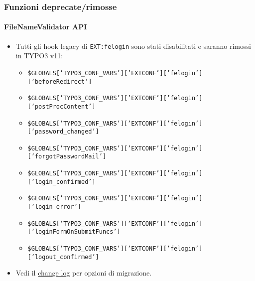 
\begin{frame}[fragile]
	\frametitle{Funzioni deprecate/rimosse}
	\framesubtitle{FileNameValidator API}

	\lstset{basicstyle=\tiny\ttfamily}

	\begin{itemize}
		\item Tutti gli hook legacy di \texttt{EXT:felogin} sono stati disabilitati e
			saranno rimossi in TYPO3 v11:

			\begin{itemize}\tiny
				\item \texttt{\$GLOBALS['TYPO3\_CONF\_VARS']['EXTCONF']['felogin']['beforeRedirect']}
				\item \texttt{\$GLOBALS['TYPO3\_CONF\_VARS']['EXTCONF']['felogin']['postProcContent']}
				\item \texttt{\$GLOBALS['TYPO3\_CONF\_VARS']['EXTCONF']['felogin']['password\_changed']}
				\item \texttt{\$GLOBALS['TYPO3\_CONF\_VARS']['EXTCONF']['felogin']['forgotPasswordMail']}
				\item \texttt{\$GLOBALS['TYPO3\_CONF\_VARS']['EXTCONF']['felogin']['login\_confirmed']}
				\item \texttt{\$GLOBALS['TYPO3\_CONF\_VARS']['EXTCONF']['felogin']['login\_error']}
				\item \texttt{\$GLOBALS['TYPO3\_CONF\_VARS']['EXTCONF']['felogin']['loginFormOnSubmitFuncs']}
				\item \texttt{\$GLOBALS['TYPO3\_CONF\_VARS']['EXTCONF']['felogin']['logout\_confirmed']}
			\end{itemize}

		\item Vedi il
			\href{https://docs.typo3.org/c/typo3/cms-core/master/en-us/Changelog/10.4/Deprecation-88740-DeprecateFeloginPibasePlugin.html}{change log}
			per opzioni di migrazione.
	\end{itemize}

\end{frame}

